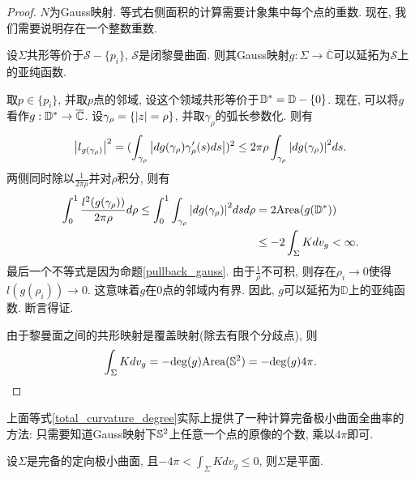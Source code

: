 \begin{proof}
    $N$为Gauss映射. 等式右侧面积的计算需要计象集中每个点的重数. 现在, 我们需要说明存在一个整数重数. 
    \begin{claim}
        设$\Sigma$共形等价于$\mathcal{S}-\{p_i\}$, $\mathcal{S}$是闭黎曼曲面.  则其Gauss映射$g: \Sigma\to \overline{\mathbb{C}}$可以延拓为$\mathcal{S}$上的亚纯函数.
        \begin{subproof}
            取$p \in \{p_i\}$, 并取$p$点的邻域, 设这个领域共形等价于$\D^*=\D - \{0\}$. 现在, 可以将$g$看作$g: \D^* \to \overline{\mathbb{C}}$. 设$\gamma_\rho=\{\abs{z}=\rho\}$, 并取$\gamma_\rho$的弧长参数化. 则有
            \begin{equation}
                \abs{l_{g(\gamma_\rho)}}^2 = (\int_{\gamma_\rho} \abs{dg(\gamma_\rho) \gamma'_\rho(s) ds})^2 \le 2\pi\rho \int_{\gamma_\rho}\abs{dg(\gamma_\rho)}^2ds.
            \end{equation}
            两侧同时除以$\frac{1}{2\pi\rho}$并对$\rho$积分, 则有
            \begin{equation}
                \begin{split}
                    \int^1_0 \frac{l^2(g(\gamma_\rho))}{2\pi\rho} d\rho \le \int^1_0 \int_{\gamma_\rho} \abs{dg(\gamma_\rho)}^2dsd\rho &= 2\Area(g(\D^*))  \\
                    &\le -2\int_\Sigma Kdv_g<\infty.
                \end{split}
            \end{equation}
            最后一个不等式是因为命题\eqref{pullback_gauss}. 由于$\frac{1}{\rho}$不可积, 则存在$\rho_i \to 0$使得  $l(g(\rho_i)) \to 0$. 这意味着$g$在0点的邻域内有界. 因此, $g$可以延拓为$\mathbb{D}$上的亚纯函数. 断言得证.
        \end{subproof}
    \end{claim}
    \par  由于黎曼面之间的共形映射是覆盖映射(除去有限个分歧点), 则
    \begin{equation}\label{total_curvature_degree}
        \int_\Sigma Kdv_g = - \text{deg}(g) \Area(\S^2) = -\text{deg}(g)4\pi.
    \end{equation}
\end{proof}
\begin{remark}
    上面等式\eqref{total_curvature_degree}实际上提供了一种计算完备极小曲面全曲率的方法: 只需要知道Gauss映射下$\S^2$上任意一个点的原像的个数, 乘以$4\pi$即可.
\end{remark}
\begin{corollary}\label{flatness_4pi}
    设$\Sigma$是完备的定向极小曲面, 且$-4\pi < \int_\Sigma K dv_g \le 0$, 则$\Sigma$是平面.
\end{corollary}
